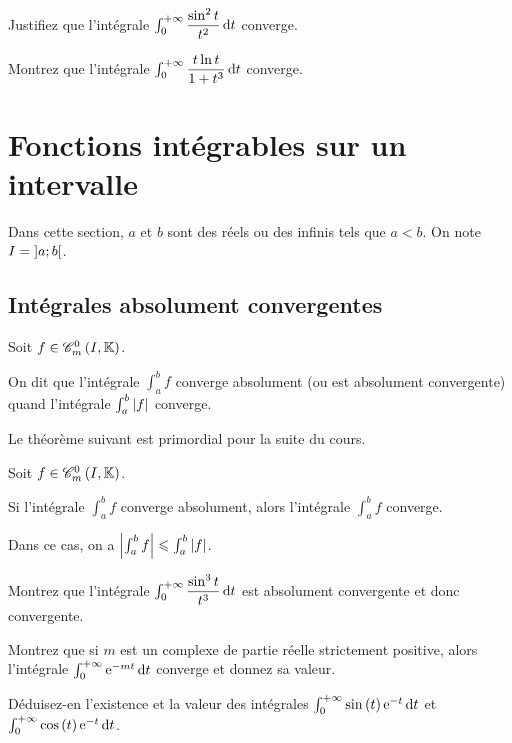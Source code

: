 \begin{exo}
Justifiez que l'intégrale \(\int_0^{\pinf}\dfrac{\sin^2t}{t^2}\odif{t}\) converge.
\end{exo}

\begin{exo}
Montrez que l'intégrale \(\int_0^{\pinf}\dfrac{t\ln t}{1+t^3}\odif{t}\) converge.
\end{exo}

\section{Fonctions intégrables sur un intervalle}

Dans cette section, \(a\) et \(b\) sont des réels ou des infinis tels que \(a<b\). On note \(I=\left]a;b\right[\).

\subsection{Intégrales absolument convergentes}

\begin{defi}
Soit \(f\in\contm[I]\).

On dit que l'intégrale \(\int_a^bf\) converge absolument (ou est absolument convergente) quand l'intégrale \(\int_a^b\left\lvert f\right\rvert\) converge.
\end{defi}

Le théorème suivant est primordial pour la suite du cours.

\begin{theo}
Soit \(f\in\contm[I]\).

Si l'intégrale \(\int_a^bf\) converge absolument, alors l'intégrale \(\int_a^bf\) converge.

Dans ce cas, on a \(\left\lvert\int_a^bf\right\rvert\leqslant\int_a^b\left\lvert f\right\rvert\).
\end{theo}

\begin{exo}
Montrez que l'intégrale \(\int_0^{\pinf}\dfrac{\sin^3t}{t^3}\odif{t}\) est absolument convergente et donc convergente.
\end{exo}

\begin{exo}
Montrez que si \(m\) est un complexe de partie réelle strictement positive, alors l'intégrale \(\int_0^{\pinf}\e{-mt}\odif{t}\) converge et donnez sa valeur.

Déduisez-en l'existence et la valeur des intégrales \(\int_0^{\pinf}\sin\paren{t}\e{-t}\odif{t}\) et \(\int_0^{\pinf}\cos\paren{t}\e{-t}\odif{t}\).
\end{exo}

